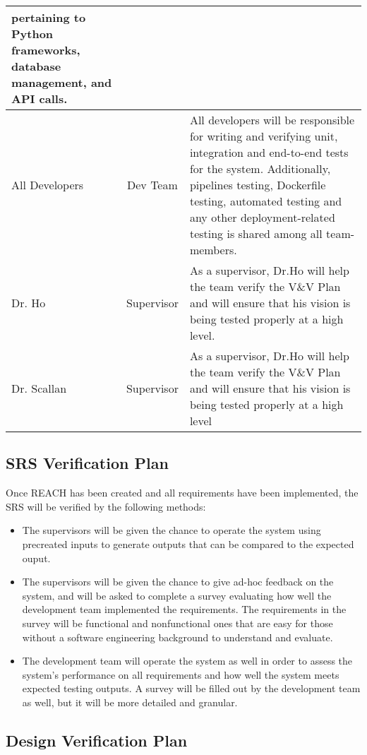 \documentclass[12pt, titlepage]{article}
\begin{document}
\begin{table}[H]
\begin{tabular}{|p{1.4cm}|c|p{12.5cm}|}
        pertaining to Python frameworks, database management, and API calls. \\
        \hline
        All Developers & Dev Team & All developers will be responsible for writing and verifying unit, integration and 
        end-to-end tests for the system. Additionally, pipelines testing, Dockerfile testing, automated testing and any 
        other deployment-related testing is shared among all team-members.\\
        \hline
        Dr. Ho & Supervisor & As a supervisor, Dr.Ho will help the team verify the V\&V Plan and will ensure that 
        his vision is being tested properly at a high level.\\
        \hline
        Dr. Scallan & Supervisor & As a supervisor, Dr.Ho will help the team verify the V\&V Plan and will 
        ensure that his vision is being tested properly at a high level \\       
        \hline
    \end{tabular}
\end{table}

\subsection{SRS Verification Plan}

Once REACH has been created and all requirements have been implemented, 
the SRS will be verified by the following methods:
\begin{itemize}
  \item The supervisors will be given the chance to operate the system using 
  precreated inputs to generate outputs that can be compared to the expected ouput. 
  \item The supervisors will be given the chance to give 
  ad-hoc feedback on the system, and will be asked to complete a survey evaluating how
  well the development team implemented the requirements. 
  The requirements in the survey will be functional and nonfunctional ones that are easy 
  for those without a software engineering background to understand and evaluate.

  \item The development team will operate the system as well in order to assess the system's
  performance on all requirements and how well the system meets expected testing outputs.
  A survey will be filled out by the development team as well, 
  but it will be more detailed and granular.
\end{itemize}
\subsection{Design Verification Plan}
\end{document}
